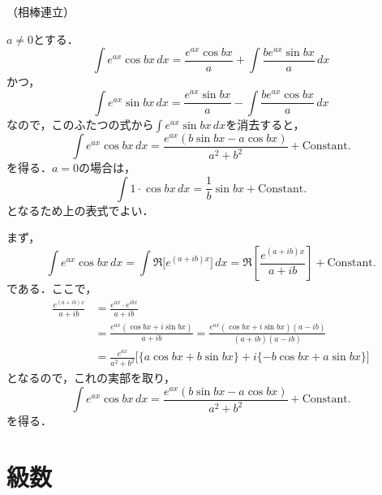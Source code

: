 \documentclass[dvipdfmx,uplatex,11pt]{jsarticle}
\theoremstyle{definition}
\begin{document}
\newpage
（相棒連立）
\begin{leftbar}
    $a \ne 0$とする．
    \[ 
        \int e^{ax} \cos bx \, dx   = \frac{e^{ax} \cos bx}{a} + \int \frac{b e^{ax} \sin bx}{a} \, dx 
    \]
    かつ，
    \[
        \int e^{ax} \sin bx \, dx  = \frac{e^{ax} \sin bx}{a}- \int \frac{b e^{ax} \cos bx}{a} \, dx 
    \]
    なので，このふたつの式から$\int e^{ax} \sin bx \, dx$を消去すると，
    \[
        \int e^{ax} \cos bx \, dx  = \frac{e^{ax}(b \sin bx- a \cos bx)}{a^2+b^2} + \mathrm{Constant.}
    \]
    を得る．$a =0$の場合は，
    \[
        \int 1 \cdot \cos bx \, dx = \frac{1}{b} \sin bx + \mathrm{Constant.}
    \]
    となるため上の表式でよい．
\end{leftbar}

\begin{leftbar}
    まず，
    \[
        \int e^{ax} \cos bx \, dx = \int \Re \bigl [e^{(a+ib)x} \bigl ] \, dx = \Re \left [\frac{e^{(a+ib)x}}{a+ib} \right] + \mathrm{Constant.}
    \]
    である．ここで，
    \begin{align*}
        \frac{e^{(a+ib)x}}{a+ib} & = \frac{e^{ax} \cdot e^{ibx}}{a+ib} \\
        & = \frac{e^{ax}(\cos bx + i \sin bx)}{a+ib}=  \frac{e^{ax}(\cos bx + i \sin bx)(a-ib)}{(a+ib)(a-ib)} \\
        & = \frac{e^{ax}}{a^2+b^2} \bigl[ \{a \cos bx + b \sin bx \}+i\{ -b \cos bx + a \sin bx\} \bigl]
    \end{align*}
    となるので，これの実部を取り，
    \[
        \int e^{ax} \cos bx \, dx  = \frac{e^{ax}(b \sin bx- a \cos bx)}{a^2+b^2} + \mathrm{Constant.}
    \]
    を得る．
\end{leftbar}

\section{級数}
\end{document}
